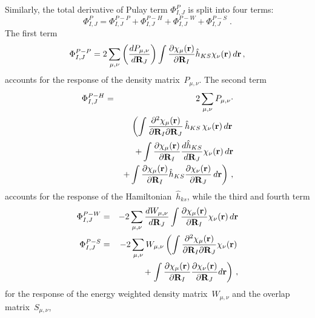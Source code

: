 \documentclass[journal=jpca,manuscript=article]{achemso}
\renewcommand{\vec}[1]{{\bf #1}}
\begin{document}
Similarly, the total derivative of Pulay term $\Phi_{I,J}^{P}$ is split into four terms:
\begin{equation}
\Phi_{I,J}^{P} = \Phi_{I,J}^{P-P} + \Phi_{I,J}^{P-H} + \Phi_{I,J}^{P-W} + \Phi_{I,J}^{P-S}\;.
\end{equation}
The first term
\begin{equation}
\Phi_{I,J}^{P-P} =  {2} \sum_{\mu,\nu} 
\left( \frac{d P_{\mu,\nu}}{d \vec{R}_{J}}\right)
\int  \dfrac{\partial \chi_{\mu}(\mathbf{r})}{\partial  \mathbf{R}_{I} }\hat{h}_{KS} \chi_{\nu}(\mathbf{r}) \, d\mathbf{r} \,, 
\label{eq:PhiPP}
\end{equation}
accounts for the response of the density matrix~$P_{\mu,\nu }$. The second term 
\begin{eqnarray}
\Phi_{I,J}^{P-H} & = &  
2\sum_{\mu,\nu}  
P_{\mu,\nu} \cdot \nonumber \\ 
&&\left(
\int  \dfrac{\partial^2 \chi_{\mu }(\mathbf{r})}{\partial  \mathbf{R}_{I}\partial  \mathbf{R}_{J} }\,\hat{h}_{KS}\, \chi_{\nu}(\mathbf{r}) \, d\mathbf{r}\right. \nonumber \\
&&+\int  \dfrac{\partial \chi_{\mu}(\mathbf{r})}{\partial  \mathbf{R}_{I} }\frac{d \hat{h}_{KS}}{d\vec{R}_{J}}\chi_{\nu}(\mathbf{r}) \, d\mathbf{r} \nonumber \\
&&\left.+\int  \dfrac{\partial \chi_{\mu}(\mathbf{r})}{\partial  \mathbf{R}_{I} }\hat{h}_{KS}\frac{\partial \chi_{\nu}(\mathbf{r})}{\partial \vec{R}_{J}} \, d\mathbf{r}
\right) \,, 
\label{eq:PhiPH}
\end{eqnarray}
accounts for the response of the Hamiltonian~$\hat{h}_{ks}$, while the third  and fourth term
\begin{eqnarray}
\Phi_{I,J}^{P-W} & = &  - 2\sum_{\mu,\nu}
\frac{d W_{\mu,\nu}}{d\vec{R}_{J}}
\int  \dfrac{\partial \chi_{\mu}(\mathbf{r})}{\partial  \mathbf{R}_{I} }\chi_{\nu}(\mathbf{r}) \, d\mathbf{r}
\label{eq:PhiPW}\\
\Phi_{I,J}^{P-S} & = &  - 2\sum_{\mu,\nu } 
W_{\mu,\nu} \left(
\int  \dfrac{\partial^2 \chi_{\mu}(\mathbf{r})}{\partial  \mathbf{R}_{I} \partial  \mathbf{R}_{J}}\chi_{\nu}(\mathbf{r}) \right. \nonumber \\ 
                &   & + \left. \int  \dfrac{\partial \chi_{\mu}(\mathbf{r})}{\partial \mathbf{R}_{I} }\dfrac{\partial \chi_{\nu}(\mathbf{r}) }{\partial\vec{R}_{J}}  d\mathbf{r} \right) \,, 
\label{eq:PhiPS}
\end{eqnarray}
for the response of the energy weighted density matrix~$W_{\mu,\nu}$ and the overlap matrix~$S_{\mu,\nu}$, 
\end{document}
